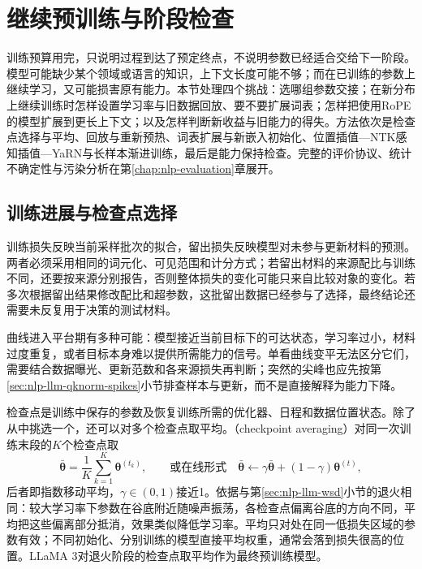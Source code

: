 \section{继续预训练与阶段检查}
\label{sec:nlp-llm-continuation}

训练预算用完，只说明过程到达了预定终点，不说明参数已经适合交给下一阶段。模型可能缺少某个领域或语言的知识，上下文长度可能不够；而在已训练的参数上继续学习，又可能损害原有能力。本节处理四个挑战：选哪组参数交接；在新分布上继续训练时怎样设置学习率与旧数据回放、要不要扩展词表；怎样把使用RoPE的模型扩展到更长上下文；以及怎样判断新收益与旧能力的得失。方法依次是检查点选择与平均、回放与重新预热、词表扩展与新嵌入初始化、位置插值—NTK感知插值—YaRN与长样本渐进训练，最后是能力保持检查。完整的评价协议、统计不确定性与污染分析在第\ref{chap:nlp-evaluation}章展开。

\subsection{训练进展与检查点选择}
\label{sec:nlp-llm-checkpoints}

训练损失反映当前采样批次的拟合，留出损失反映模型对未参与更新材料的预测。两者必须采用相同的词元化、可见范围和计分方式；若留出材料的来源配比与训练不同，还要按来源分别报告，否则整体损失的变化可能只来自比较对象的变化。若多次根据留出结果修改配比和超参数，这批留出数据已经参与了选择，最终结论还需要未反复用于决策的测试材料。

曲线进入平台期有多种可能：模型接近当前目标下的可达状态，学习率过小，材料过度重复，或者目标本身难以提供所需能力的信号。单看曲线变平无法区分它们，需要结合数据曝光、更新范数和各来源损失再判断；突然的尖峰也应先按第\ref{sec:nlp-llm-qknorm-spikes}小节排查样本与更新，而不是直接解释为能力下降。

检查点是训练中保存的参数及恢复训练所需的优化器、日程和数据位置状态。除了从中挑选一个，还可以对多个检查点取平均。（checkpoint averaging）对同一次训练末段的$K$个检查点取
\begin{equation}
 \bar{\bm\theta}=\frac1K\sum_{k=1}^{K}\bm\theta^{(t_k)},
 \qquad\text{或在线形式}\quad
 \bar{\bm\theta}\gets\gamma\bar{\bm\theta}+(1-\gamma)\bm\theta^{(t)},
 \label{eq:nlp-llm-checkpoint-average}
\end{equation}
后者即指数移动平均，$\gamma\in(0,1)$接近1。依据与第\ref{sec:nlp-llm-wsd}小节的退火相同：较大学习率下参数在谷底附近随噪声振荡，各检查点偏离谷底的方向不同，平均把这些偏离部分抵消，效果类似降低学习率。平均只对处在同一低损失区域的参数有效；不同初始化、分别训练的模型直接平均权重，通常会落到损失很高的位置。LLaMA 3对退火阶段的检查点取平均作为最终预训练模型。

